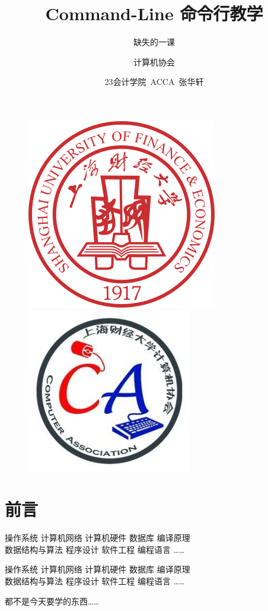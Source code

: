 \documentclass[UTF8, 16pt]{beamer}
\author[计算机协会] %
{
计算机协会
}
\title[Command-Line 命令行教学]{Command-Line 命令行教学}
\subtitle{缺失的一课}
\institute[SUFE]
{
上海财经大学
}
\date{23会计学院\ ACCA\ 张华轩}
\begin{document}
\begin{frame}[noframenumbering]
    \titlepage{}
    \vspace{-0.5cm}
    \begin{figure}[htpb]
        \begin{center}
            \includegraphics[width=0.19 \linewidth]{sufe_logo.png}
            \quad
            \includegraphics[width=0.19 \linewidth]{ca_logo.png}
        \end{center}
    \end{figure}
\end{frame}


\section{前言}
\begin{frame}
    \textcolor{sufered}{
        操作系统 \quad
        计算机网络 \quad
        计算机硬件 \quad
        数据库 \quad
        编译原理 \\
        数据结构与算法 \quad
        程序设计 \quad
        软件工程 \quad
        编程语言 \quad
        \dots\dots
    }
\end{frame}

\begin{frame}
    \textcolor{sufered}{
        操作系统 \quad
        计算机网络 \quad
        计算机硬件 \quad
        数据库 \quad
        编译原理 \\
        数据结构与算法 \quad
        程序设计 \quad
        软件工程 \quad
        编程语言 \quad
        \dots\dots
    }

    都不是今天要学的东西\dots\dots
\end{frame}
\end{document}
